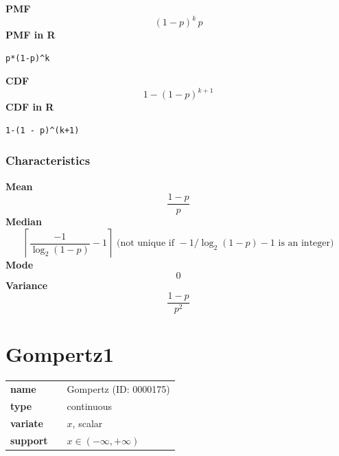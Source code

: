 \smallskip \noindent \hspace{.2cm} \textbf{PMF} 
\begin{equation*}(1 - p)^k\,p\end{equation*}
\smallskip \noindent \hspace{.2cm} \textbf{PMF in R}  
\begin{verbatim}p*(1-p)^k\end{verbatim}
\smallskip \noindent \hspace{.2cm} \textbf{CDF} 
\begin{equation*}1-(1 - p)^{k+1}\end{equation*}
\smallskip \noindent \hspace{.2cm} \textbf{CDF in R} 
\begin{verbatim}1-(1 - p)^(k+1)\end{verbatim}
\smallskip
\subsubsection*{Characteristics}
\smallskip \noindent \hspace{.2cm} \textbf{Mean} 
\begin{equation*}\frac{1-p}{p}\end{equation*}
\smallskip \noindent \hspace{.2cm} \textbf{Median} 
\begin{equation*}\left\lceil \frac{-1}{\log_2(1-p)}-1 \right\rceil \text{ (not unique if } -1/\log_2(1-p)-1 \text{ is an integer)}\end{equation*}
\smallskip \noindent \hspace{.2cm} \textbf{Mode} 
\begin{equation*}0\end{equation*}
\smallskip \noindent \hspace{.2cm} \textbf{Variance} 
\begin{equation*}\frac{1-p}{p^2}\end{equation*}
\smallskip
\section*{Gompertz1} 

  \bigskip 

\begin{tabular}{p{2cm}cl}
\textbf{name} & & Gompertz (ID: 0000175)\\ 
 
\textbf{type} & & continuous \\ 

\textbf{variate} & & $x$, scalar \\ 

\textbf{support} & & $x \in (-\infty,+\infty)$
\end{tabular}

